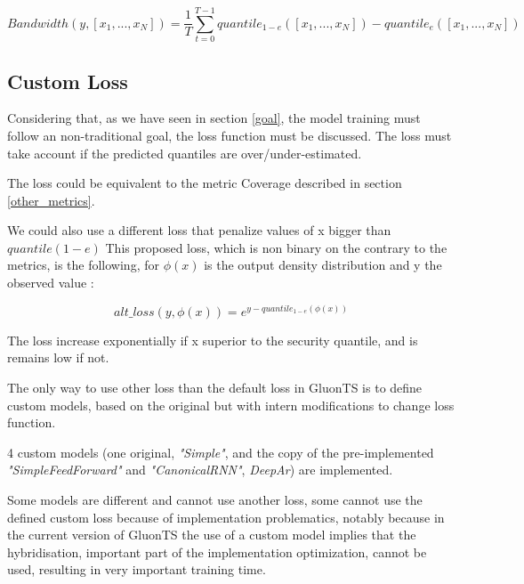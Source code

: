 \begin{equation}
    Bandwidth(y,[{x_1},...,{x_N}]) = \frac{1}{T}  \sum_{t=0}^{T-1} quantile_{1-e}([{x_1},...,{x_N}]) - quantile_e([{x_1},...,{x_N}])
\end{equation}


\subsection{Custom Loss} \label{custom_loss}
Considering that, as we have seen in section \ref{goal}, the model training must follow an non-traditional goal, the loss function must be discussed.
The loss must take account if the predicted quantiles are over/under-estimated.

The loss could be equivalent to the metric Coverage described in section \ref{other_metrics}.

We could also use a different loss that penalize values of x bigger than $quantile(1-e)$
This proposed loss, which is non binary on the contrary to the metrics, is the following, for $\phi(x)$ is the output density distribution and y the observed value  :

\begin{equation}
    alt\_loss(y, \phi(x) ) =  e^{y - quantile_{1-e}(\phi(x))} 
\end{equation}


The loss increase exponentially if x superior to the security quantile, and is remains low if not.



The only way to use other loss than the default loss in GluonTS is to define custom models, based on the original but with intern modifications to change loss function.

4 custom models (one original, \textit{"Simple"}, and the copy of the pre-implemented \textit{"SimpleFeedForward"} and 
\textit{"CanonicalRNN"}, \textit{DeepAr}) are implemented. 

Some models are different and cannot use another loss, some cannot use the defined custom loss because of implementation problematics, notably because in the current version of GluonTS the use of a custom model implies that the hybridisation, important part of the implementation optimization, cannot be used, resulting in very important training time.

